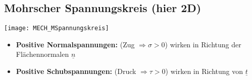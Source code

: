 \documentclass[numerate]{cheatsheet}
\begin{document}
    \subsection{Mohrscher Spannungskreis (hier 2D)}
        \begin{scriptsize}
            \begin{center}
                \texttt{[image: MECH\_MSpannungskreis]}
            \end{center}
            \begin{itemize}
                \item \textbf{Positive Normalspannungen:} (Zug $\Rightarrow \sigma > 0$) wirken in Richtung der \\Flächennormalen $\underline{n}$
                \item \textbf{Positive Schubspannungen:} (Druck $\Rightarrow \tau > 0$) wirken in Richtung von $\underline{t}$
            \end{itemize}
        \end{scriptsize}    
\end{document}

